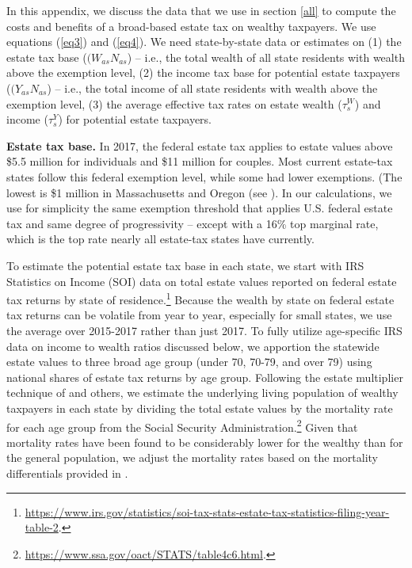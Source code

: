\documentclass[12pt]{article}
\begin{document}

\vspace{20pt}

\vspace{10pt}

In this appendix, we discuss the data that we use in section \ref{all} to compute the costs and benefits of a broad-based estate tax on wealthy taxpayers.
We use equations (\ref{eq3}) and (\ref{eq4}).   
We need  state-by-state data or estimates on (1) the estate tax base ($(W_{as} N_{as}$) -- i.e., the total wealth of all state residents with wealth above the exemption level, (2) the income tax base for potential estate taxpayers ($(Y_{as} N_{as}$) -- i.e., the total income of all state residents with wealth above the exemption level, (3) the average effective tax rates on estate wealth ($\tau_s^{W}$) and income ($\tau_s^{Y}$) for potential estate taxpayers. 

\textbf{Estate tax base. }
In 2017, the federal estate tax applies to estate values above \$5.5 million for individuals and \$11 million for couples. Most current estate-tax states follow this federal exemption level, while some had lower exemptions. (The lowest is \$1 million in Massachusetts and Oregon (see \cite{michael2018survey}).
In our calculations, we use for simplicity the same exemption threshold  that applies U.S. federal estate tax 
and same degree of progressivity -- except with a 16\% top marginal rate, which is the top rate nearly all estate-tax states have currently. 

To estimate the potential estate tax base in each state, we start with IRS Statistics on Income (SOI) data on total estate values reported on federal estate tax returns by state of residence.\footnote{\url{https://www.irs.gov/statistics/soi-tax-stats-estate-tax-statistics-filing-year-table-2}.} Because the wealth by state on federal estate tax returns can be volatile from year to year, especially for small states, we use the average over 2015-2017 rather than just 2017. To fully utilize age-specific IRS data on income to wealth ratios discussed below, we apportion the statewide estate values to three broad age group (under 70, 70-79, and over 79) using national shares of estate tax returns by age group. Following the estate multiplier technique of \cite{kopczuk-saez:2004} and others, we estimate the underlying living population of wealthy taxpayers in each state by dividing the total estate values by the mortality rate for each age group from the Social Security Administration.\footnote{\url{https://www.ssa.gov/oact/STATS/table4c6.html}.} Given that mortality rates have been found to be considerably lower for the wealthy than for the general population, we adjust the mortality rates based on the mortality differentials provided in \cite{saez-zucman:2019}.   
\end{document}
